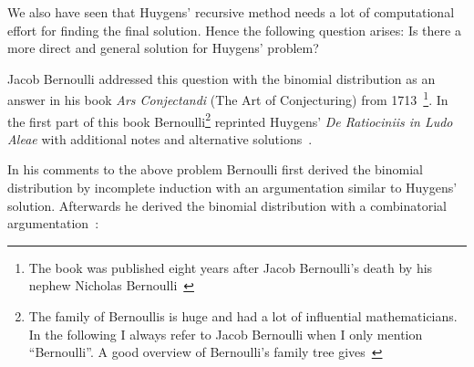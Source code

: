 We also have seen that Huygens' recursive method needs a lot of computational effort for finding the final solution. Hence the following question arises: Is there a more direct and general solution for Huygens' problem?


Jacob Bernoulli addressed this question with the binomial distribution as an answer in his book \emph{Ars Conjectandi} (The Art of Conjecturing) from 1713~\cite[pp. 220-256]{hald1}\footnote{The book was published eight years after Jacob Bernoulli's death by his nephew Nicholas Bernoulli~\cite[pp. 223-224]{hald1}}. In the first part of this book Bernoulli\footnote{The family of Bernoullis is huge and had a lot of influential mathematicians. In the following I always refer to Jacob Bernoulli when I only mention ``Bernoulli''. A good overview of Bernoulli's family tree gives~\cite[pp. 1-4]{bernoulli}} reprinted Huygens' \emph{De Ratiociniis in Ludo Aleae} with additional notes and alternative solutions~\cite[p. 63]{bernoulli}.

In his comments to the above problem Bernoulli first derived the binomial distribution by incomplete induction with an argumentation similar to Huygens' solution. Afterwards he derived the binomial distribution with a combinatorial argumentation~\cite[pp. 165-167]{bernoulli}:

